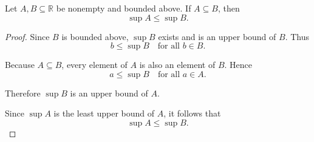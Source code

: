 \begin{theorem*}
Let $A,B \subseteq \mathbb{R}$ be nonempty and bounded above.  
If $A \subseteq B$, then
\[
\sup A \le \sup B .
\]
\end{theorem*}

\begin{proof}
Since $B$ is bounded above, $\sup B$ exists and is an upper bound of $B$.  
Thus
\[
b \le \sup B \quad \text{for all } b \in B .
\]

Because $A \subseteq B$, every element of $A$ is also an element of $B$.  
Hence
\[
a \le \sup B \quad \text{for all } a \in A .
\]

Therefore $\sup B$ is an upper bound of $A$.

Since $\sup A$ is the least upper bound of $A$, it follows that
\[
\sup A \le \sup B .
\]
\end{proof}
